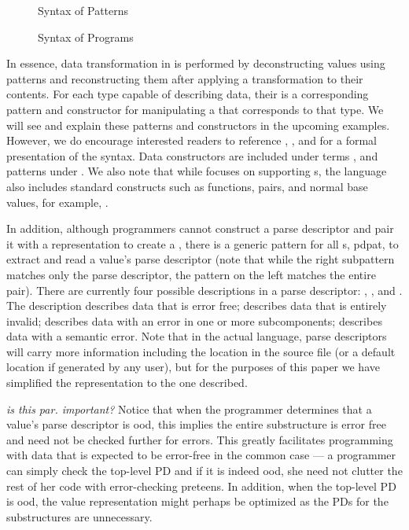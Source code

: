 \begin{figure}
  \centering
  
  \caption{Syntax of Patterns}
  \label{fig:syntax-pat}
\end{figure}

\begin{figure}
  \centering
  
  \caption{Syntax of Programs}
  \label{fig:syntax-prog}
\end{figure}

In essence, data transformation in \datatype{} is performed by
deconstructing values using patterns and reconstructing them after
applying a transformation to their contents. For each type capable of
describing data, their is a corresponding pattern and constructor for
manipulating a \pvalue{} that corresponds to that type. We will see
and explain these patterns and constructors in the upcoming examples.
However, we do encourage interested readers to reference
, ,
 and  for a formal
presentation of the syntax. Data constructors are included under terms
, and patterns under . We also note that while
\datatype{} focuses on supporting \pvalue{}s, the language also
includes standard constructs such as functions, pairs, and normal base
values, for example, .

In addition, although programmers cannot construct a parse descriptor
and pair it with a representation to create a \pvalue{}, there is a
generic pattern for all \pvalue{}s,  {pdpat}, to
extract and read a value's parse descriptor (note that while the right
subpattern matches only the parse descriptor, the pattern on the left
matches the entire pair). There are currently four possible
descriptions in a parse descriptor: \pdgood{}, \pdbad{},\pdnest{} and
\pdsem{}. The description \pdgood{} describes data that is error free;
\pdbad{} describes data that is entirely invalid; \pdnest{} describes
data with an error in one or more subcomponents; \pdsem{} describes
data with a semantic error.  Note that in the actual language, parse
descriptors will carry more information including the location in the
source file (or a default location if generated by any user), but for
the purposes of this paper we have simplified the representation to
the one described.

{\em is this par. important?}
Notice that when the programmer
determines that a value's parse descriptor is ood, this implies
the entire substructure is error free and need not be checked further
for errors.  This greatly facilitates programming with data that is
expected to be error-free in the common case --- a programmer can
simply check the top-level PD and if it is indeed ood, she need
not clutter the rest of her code with error-checking preteens.  In
addition, when the top-level PD is ood, the value representation
might perhaps be optimized as the PDs for the substructures are
unnecessary.
  
